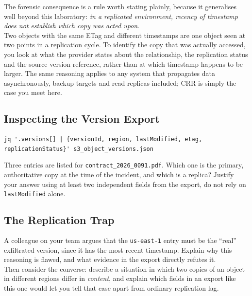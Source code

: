 \medskip

\noindent
The forensic consequence is a rule worth stating plainly, because it generalises well beyond this laboratory: \emph{in a replicated environment, recency of timestamp does not establish which copy
was acted upon}.\\
Two objects with the same ETag and different timestamps are one object seen at two points in a replication cycle. To identify the copy that was actually accessed, you look at what the provider states about the relationship, the replication status and the source-version reference, rather than at which timestamp happens to be larger. The same reasoning applies to any system that propagates data asynchronously, backup targets and read replicas included; CRR is simply the case you meet here.

\subsection{Inspecting the Version Export}

\begin{lstlisting}
jq '.versions[] | {versionId, region, lastModified, etag, replicationStatus}' s3_object_versions.json
\end{lstlisting}

\begin{questionbox}
Three entries are listed for \texttt{contract\_2026\_0091.pdf}. Which one is the primary,
authoritative copy at the time of the incident, and which is a replica? Justify your answer
using at least two independent fields from the export, do not rely on \texttt{lastModified}
alone.
\end{questionbox}

\begin{answerbox}
\vspace{2.5cm}
\end{answerbox}

\subsection{The Replication Trap}

\begin{questionbox}
A colleague on your team argues that the \texttt{us-east-1} entry must be the ``real''
exfiltrated version, since it has the most recent timestamp. Explain why this reasoning is
flawed, and what evidence in the export directly refutes it.\\
Then consider the converse: describe a situation in which two copies of an object in different
regions differ in \emph{content}, and explain which fields in an export like this one would let
you tell that case apart from ordinary replication lag.
\end{questionbox}


